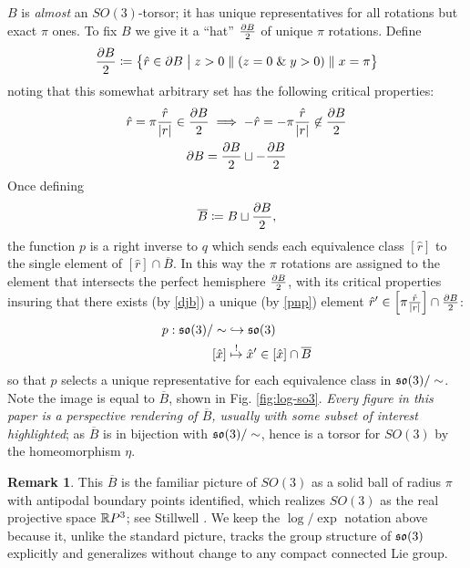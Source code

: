 \documentclass{amsart}
\theoremstyle{plain}
\theoremstyle{definition}
\newtheorem*{remark}{Remark}
\begin{document}
    $B$ is \emph{almost} an $SO(3)$-torsor; it has unique representatives for all rotations but exact $\pi$ ones. To fix $B$ we give it a ``hat'' $\frac{\partial B}{2}$ of unique $\pi$ rotations. Define
    \begin{equation}
        \frac{\partial B}{2}\coloneqq\left\{\hat{r}\in\partial B\hspace{1mm}\big|\hspace{1mm} z>0\parallel (z=0\hspace{1mm}\mathrm{\&}\hspace{1mm} y>0)\parallel x=\pi\right\}
    \end{equation}
    noting that this somewhat arbitrary set has the following critical properties:
    \begin{gather}
        \hat{r}=\pi\frac{\hat{r}}{|r|}\in \frac{\partial B}{2}\implies -\hat{r}=-\pi\frac{\hat{r}}{|r|}\not\in \frac{\partial B}{2}\label{pnp}\\
        \partial B=\frac{\partial B}{2}\sqcup -\frac{\partial B}{2}\label{djb}
    \end{gather}
    Once defining
    \begin{equation}
        \overline{B}\coloneqq B\sqcup \frac{\partial B}{2},
    \end{equation}
    the function $p$ is a right inverse to $q$ which sends each equivalence class $[\hat{r}]$ to the single element of $[\hat{r}]\cap\overline{B}$. In this way the $\pi$ rotations are assigned to the element that intersects the perfect hemisphere $\frac{\partial B}{2}$, with its critical properties insuring that there exists (by \ref{djb}) a unique (by \ref{pnp}) element $\hat{r}'\in\left[\pi\frac{\hat{r}}{|r|}\right]\cap \frac{\partial B}{2}$:
    \begin{align}
        p:\mathfrak{so}(3)/\sim &\hookrightarrow \mathfrak{so}(3) \\
        [\hat{x}]&\overset{!}{\mapsto} \hat{x}'\in [\hat{x}]\cap\overline{B}
    \end{align}
    so that $p$ selects a unique representative for each equivalence class in $\mathfrak{so}(3)/\sim$. Note the image is equal to $\overline{B}$, shown in Fig. \ref{fig:log-so3}. \emph{Every figure in this paper is a perspective rendering of $\overline{B}$, usually with some subset of interest highlighted}; as $\overline{B}$ is in bijection with $\mathfrak{so}(3)/\sim$, hence is a torsor for $SO(3)$ by the homeomorphism $\eta$.
    \begin{remark}
        This $\overline{B}$ is the familiar picture of $SO(3)$ as a solid ball of radius $\pi$ with antipodal boundary points identified, which realizes $SO(3)$ as the real projective space $\mathbb{R} P^3$; see Stillwell \cite{stillwell2008}. We keep the $\log/\exp$ notation above because it, unlike the standard picture, tracks the group structure of $\mathfrak{so}(3)$ explicitly and generalizes without change to any compact connected Lie group.
    \end{remark}
\end{document}
